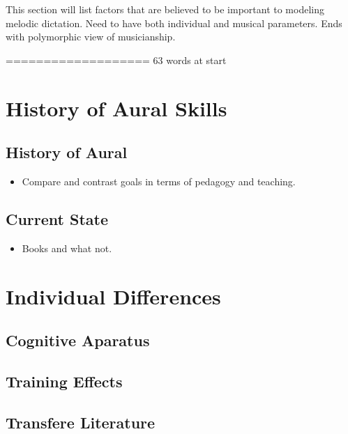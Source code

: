 \documentclass[]{book}
\providecommand{\tightlist}{%
  \setlength{\itemsep}{0pt}\setlength{\parskip}{0pt}}
\theoremstyle{definition}
\theoremstyle{definition}
\theoremstyle{definition}
\theoremstyle{remark}
\begin{document}
This section will list factors that are believed to be important to
modeling melodic dictation. Need to have both individual and musical
parameters. Ends with polymorphic view of musicianship.

=================== 63 words at start

\hypertarget{history-of-aural-skills}{%
\chapter{History of Aural Skills}\label{history-of-aural-skills}}

\hypertarget{history-of-aural}{%
\section{History of Aural}\label{history-of-aural}}

\begin{itemize}
\tightlist
\item
  Compare and contrast goals in terms of pedagogy and teaching.
\end{itemize}

\hypertarget{current-state}{%
\section{Current State}\label{current-state}}

\begin{itemize}
\tightlist
\item
  Books and what not.
\end{itemize}

\hypertarget{individual-differences}{%
\chapter{Individual Differences}\label{individual-differences}}

\hypertarget{cognitive-aparatus}{%
\section{Cognitive Aparatus}\label{cognitive-aparatus}}

\hypertarget{training-effects}{%
\section{Training Effects}\label{training-effects}}

\hypertarget{transfere-literature}{%
\section{Transfere Literature}\label{transfere-literature}}
\end{document}
